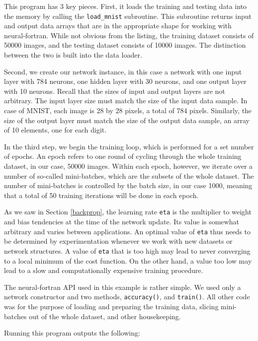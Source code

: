 \documentclass[sigplan, review=false, screen=true, balance=true]{acmart}
\begin{document}
This program has 3 key pieces. First, it loads the training and testing data
into the memory by calling the \lstinline{load_mnist} subroutine. This subroutine
returns input and output data arrays that are in the appropriate shape for
working with neural-fortran. While not obvious from the listing, the training
dataset consists of 50000 images, and the testing dataset consists of 10000
images. The distinction between the two is built into the data loader.

Second, we create our network instance, in this case a network with one input
layer with 784 neurons, one hidden layer with 30 neurons, and one output layer
with 10 neurons. Recall that the sizes of input and output layers are not
arbitrary. The input layer size must match the size of the input data sample.
In case of MNIST, each image is 28 by 28 pixels, a total of 784 pixels.
Similarly, the size of the output layer must match the size of the output
data sample, an array of 10 elements, one for each digit.

In the third step, we begin the training loop, which is performed for a set
number of epochs. An epoch refers to one round of cycling through the whole
training dataset, in our case, 50000 images. Within each epoch, however,
we iterate over a number of so-called mini-batches, which are the subsets of
the whole dataset. The number of mini-batches is controlled by the batch size,
in our case 1000, meaning that a total of 50 training iterations will be done
in each epoch.

As we saw in Section \ref{backprop}, the learning rate \lstinline{eta} is the
multiplier to weight and bias tendencies at the time of the network update.
Its value is somewhat arbitrary and varies between applications. An optimal
value of \lstinline{eta} thus needs to be determined by experimentation whenever
we work with new datasets or network structures. A value of \lstinline{eta}
that is too high may lead to never converging to a local minimum of the cost
function. On the other hand, a value too low may lead to a slow and
computationally expensive training procedure.

The neural-fortran API used in this example is rather simple. We used only
a network constructor and two methods, \lstinline{accuracy()}, and
\lstinline{train()}. All other code was for the purpose of loading and
preparing the training data, slicing mini-batches out of the whole dataset,
and other housekeeping.

Running this program outputs the following:
\end{document}
